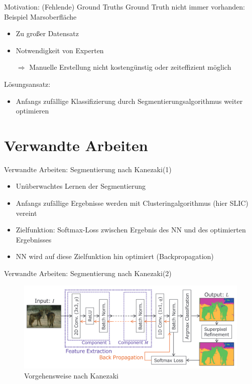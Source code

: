 \documentclass[9pt]{beamer}
\begin{document}
\begin{frame}{Motivation: (Fehlende) Ground Truths}
Ground Truth nicht immer vorhanden: Beispiel Marsoberfläche
\begin{itemize}
	\item Zu großer Datensatz
	\item Notwendigkeit von Experten
	\item[$\Rightarrow$] Manuelle Erstellung nicht kostengünstig oder zeiteffizient möglich
\end{itemize}
\medskip
Lösungsansatz:
\begin{itemize}
	\item Anfangs zufällige Klassifizierung durch Segmentierungsalgorithmus weiter optimieren
\end{itemize}
\end{frame}

\section{Verwandte Arbeiten}

\begin{frame}{Verwandte Arbeiten: Segmentierung nach Kanezaki\footnotemark[1] (1)}
\begin{itemize}
	\item Unüberwachtes Lernen der Segmentierung
	\item Anfangs zufällige Ergebnisse werden mit Clusteringalgorithmus (hier SLIC\footnotemark[2]) vereint
	\item Zielfunktion: Softmax-Loss zwischen Ergebnis des NN und des optimierten Ergebnisses
	\item NN wird auf diese Zielfunktion hin optimiert (Backpropagation)
\end{itemize}
\end{frame}

\begin{frame}{Verwandte Arbeiten: Segmentierung nach Kanezaki\footnotemark[1] (2)}
\begin{figure}
	\includegraphics[width=\textwidth,keepaspectratio]{kanezaki.png}
	\caption{Vorgehensweise nach Kanezaki}
\end{figure}
\end{frame}
\end{document}
